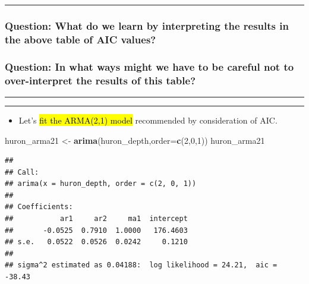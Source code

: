 \documentclass[]{article}
\newenvironment{Shaded}{\begin{snugshade}}{\end{snugshade}}
\newcommand{\KeywordTok}[1]{\textcolor[rgb]{0.13,0.29,0.53}{\textbf{#1}}}
\newcommand{\DataTypeTok}[1]{\textcolor[rgb]{0.13,0.29,0.53}{#1}}
\newcommand{\DecValTok}[1]{\textcolor[rgb]{0.00,0.00,0.81}{#1}}
\newcommand{\StringTok}[1]{\textcolor[rgb]{0.31,0.60,0.02}{#1}}
\newcommand{\NormalTok}[1]{#1}
\providecommand{\tightlist}{%
  \setlength{\itemsep}{0pt}\setlength{\parskip}{0pt}}
\begin{document}
\begin{center}\rule{0.5\linewidth}{\linethickness}\end{center}

\subsubsection{Question: What do we learn by interpreting the results in
the above table of AIC
values?}\label{question-what-do-we-learn-by-interpreting-the-results-in-the-above-table-of-aic-values}

\subsubsection{Question: In what ways might we have to be careful not to
over-interpret the results of this
table?}\label{question-in-what-ways-might-we-have-to-be-careful-not-to-over-interpret-the-results-of-this-table}

\begin{center}\rule{0.5\linewidth}{\linethickness}\end{center}

\begin{center}\rule{0.5\linewidth}{\linethickness}\end{center}

\begin{itemize}
\tightlist
\item
  Let's \hl{fit the ARMA(2,1) model} recommended by consideration of AIC.
\end{itemize}

\begin{Shaded}
\begin{Highlighting}[]
\NormalTok{huron_arma21 <-}\StringTok{ }\KeywordTok{arima}\NormalTok{(huron_depth,}\DataTypeTok{order=}\KeywordTok{c}\NormalTok{(}\DecValTok{2}\NormalTok{,}\DecValTok{0}\NormalTok{,}\DecValTok{1}\NormalTok{))}
\NormalTok{huron_arma21}
\end{Highlighting}
\end{Shaded}

\begin{verbatim}
## 
## Call:
## arima(x = huron_depth, order = c(2, 0, 1))
## 
## Coefficients:
##           ar1     ar2     ma1  intercept
##       -0.0525  0.7910  1.0000   176.4603
## s.e.   0.0522  0.0526  0.0242     0.1210
## 
## sigma^2 estimated as 0.04188:  log likelihood = 24.21,  aic = -38.43
\end{verbatim}
\end{document}
